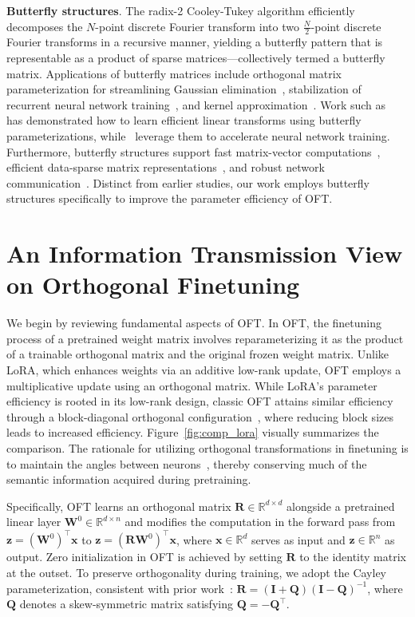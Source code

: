 \textbf{Butterfly structures}. The radix-2 Cooley-Tukey algorithm efficiently decomposes the $N$-point discrete Fourier transform into two $\frac{N}{2}$-point discrete Fourier transforms in a recursive manner, yielding a butterfly pattern that is representable as a product of sparse matrices—collectively termed a butterfly matrix. Applications of butterfly matrices include orthogonal matrix parameterization for streamlining Gaussian elimination~\cite{parker1995random}, stabilization of recurrent neural network training~\cite{jing2017tunable}, and kernel approximation~\cite{munkhoeva2018quadrature}. Work such as~\cite{dao2019learning,dao2019kaleidoscope} has demonstrated how to learn efficient linear transforms using butterfly parameterizations, while~\cite{chen2022pixelated,dao2022monarch} leverage them to accelerate neural network training. Furthermore, butterfly structures support fast matrix-vector computations~\cite{michielssen1996multilevel,o2010algorithm}, efficient data-sparse matrix representations~\cite{li2015butterfly}, and robust network communication~\cite{klasing1994broadcasting,li2003linear,rajasingh2016transmission}. Distinct from earlier studies, our work employs butterfly structures specifically to improve the parameter efficiency of OFT.

\section{An Information Transmission View on Orthogonal Finetuning}

We begin by reviewing fundamental aspects of OFT. In OFT, the finetuning process of a pretrained weight matrix involves reparameterizing it as the product of a trainable orthogonal matrix and the original frozen weight matrix. Unlike LoRA, which enhances weights via an additive low-rank update, OFT employs a multiplicative update using an orthogonal matrix. While LoRA's parameter efficiency is rooted in its low-rank design, classic OFT attains similar efficiency through a block-diagonal orthogonal configuration~\cite{qiu2023controlling}, where reducing block sizes leads to increased efficiency. Figure~\ref{fig:comp_lora} visually summarizes the comparison. The rationale for utilizing orthogonal transformations in finetuning is to maintain the angles between neurons~\cite{liu2018learning,liu2021orthogonal,qiu2023controlling}, thereby conserving much of the semantic information acquired during pretraining.

Specifically, OFT learns an orthogonal matrix $\bm{R}\in\mathbb{R}^{d\times d}$ alongside a pretrained linear layer $\bm{W}^0\in\mathbb{R}^{d\times n}$ and modifies the computation in the forward pass from $\bm{z}=(\bm{W}^0)^\top\bm{x}$ to $\bm{z}=(\bm{R}\bm{W}^0)^\top\bm{x}$, where $\bm{x}\in\mathbb{R}^{d}$ serves as input and $\bm{z}\in\mathbb{R}^{n}$ as output. Zero initialization in OFT is achieved by setting $\bm{R}$ to the identity matrix at the outset. To preserve orthogonality during training, we adopt the Cayley parameterization, consistent with prior work~\cite{qiu2023controlling,liu2021orthogonal}: $\bm{R}=(\bm{I}+\bm{Q})(\bm{I}-\bm{Q})^{-1}$, where $\bm{Q}$ denotes a skew-symmetric matrix satisfying $\bm{Q}=-\bm{Q}^\top$. 

